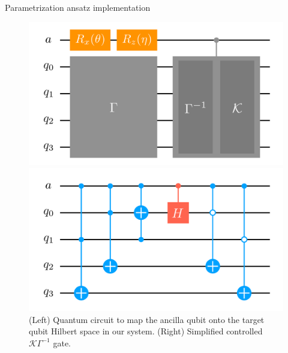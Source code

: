 \begin{frame}[allowframebreaks]{Parametrization ansatz implementation}
	\begin{figure}[!p]
		\centering
		\begin{minipage}[c]{.45\linewidth}
			\centering
			\includegraphics[width=\linewidth]{Figures/NJL1-model-solving/ansatz-implementation-ancilla-mapping}
		\end{minipage}
		\hspace{.025\linewidth}
		\begin{minipage}[c]{.45\linewidth}
			\centering
			\includegraphics[width=\linewidth]{Figures/NJL1-model-solving/ansatz-implementation-controlled-gammakappa}
		\end{minipage}
		\caption{(Left) Quantum circuit to map the ancilla qubit onto the target qubit Hilbert space in our system. (Right) Simplified controlled $\mathcal{K}\Gamma^{-1}$ gate.}
	\end{figure}

\break


\end{frame}
